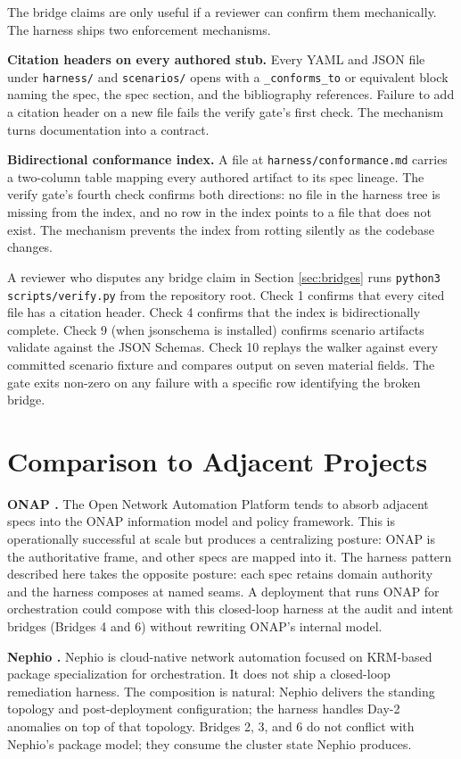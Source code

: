 \documentclass[twocolumn,10pt,a4paper]{article}
\begin{document}
The bridge claims are only useful if a reviewer can confirm them mechanically. The harness ships two enforcement mechanisms.

\textbf{Citation headers on every authored stub.} Every YAML and JSON file under \texttt{harness/} and \texttt{scenarios/} opens with a \texttt{\_conforms\_to} or equivalent block naming the spec, the spec section, and the bibliography references. Failure to add a citation header on a new file fails the verify gate's first check. The mechanism turns documentation into a contract.

\textbf{Bidirectional conformance index.} A file at \texttt{harness/conformance.md} carries a two-column table mapping every authored artifact to its spec lineage. The verify gate's fourth check confirms both directions: no file in the harness tree is missing from the index, and no row in the index points to a file that does not exist. The mechanism prevents the index from rotting silently as the codebase changes.

A reviewer who disputes any bridge claim in Section \ref{sec:bridges} runs \texttt{python3 scripts/verify.py} from the repository root. Check 1 confirms that every cited file has a citation header. Check 4 confirms that the index is bidirectionally complete. Check 9 (when jsonschema is installed) confirms scenario artifacts validate against the JSON Schemas. Check 10 replays the walker against every committed scenario fixture and compares output on seven material fields. The gate exits non-zero on any failure with a specific row identifying the broken bridge.

\section{Comparison to Adjacent Projects}
\label{sec:compare}

\textbf{ONAP \cite{onap}.} The Open Network Automation Platform tends to absorb adjacent specs into the ONAP information model and policy framework. This is operationally successful at scale but produces a centralizing posture: ONAP is the authoritative frame, and other specs are mapped into it. The harness pattern described here takes the opposite posture: each spec retains domain authority and the harness composes at named seams. A deployment that runs ONAP for orchestration could compose with this closed-loop harness at the audit and intent bridges (Bridges 4 and 6) without rewriting ONAP's internal model.

\textbf{Nephio \cite{nephio}.} Nephio is cloud-native network automation focused on KRM-based package specialization for orchestration. It does not ship a closed-loop remediation harness. The composition is natural: Nephio delivers the standing topology and post-deployment configuration; the harness handles Day-2 anomalies on top of that topology. Bridges 2, 3, and 6 do not conflict with Nephio's package model; they consume the cluster state Nephio produces.
\end{document}
